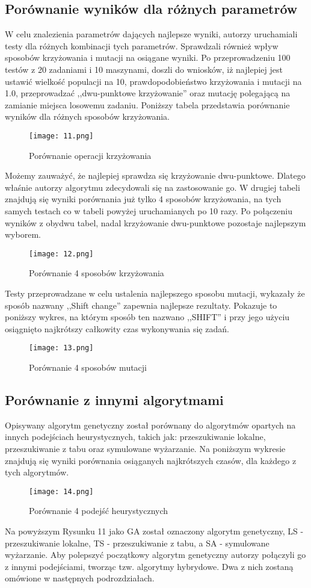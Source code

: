 \documentclass{article}
\begin{document}
\subsection{Porównanie wyników dla różnych parametrów}
 W celu znalezienia parametrów dających najlepsze wyniki, autorzy uruchamiali testy dla różnych kombinacji tych parametrów. Sprawdzali również wpływ sposobów krzyżowania i mutacji na osiągane wyniki. Po przeprowadzeniu 100 testów z 20 zadaniami i 10 maszynami, doszli do wniosków, iż najlepiej jest ustawić wielkość populacji na 10, prawdopodobieństwo krzyżowania i mutacji na 1.0, przeprowadzać ,,dwu-punktowe krzyżowanie'' oraz mutację polegającą na zamianie miejsca losowemu zadaniu. Poniższy tabela przedstawia porównanie wyników dla różnych sposobów krzyżowania.
 \begin{figure}[H]
 \centering
 \texttt{[image: 11.png]}
 \caption{Porównanie operacji krzyżowania}
 \end{figure}
 Możemy zauważyć, że najlepiej sprawdza się krzyżowanie dwu-punktowe. Dlatego właśnie autorzy algorytmu zdecydowali się na zastosowanie go. W drugiej tabeli znajdują się wyniki porównania już tylko 4 sposobów krzyżowania, na tych samych testach co w tabeli powyżej uruchamianych po 10 razy. Po połączeniu wyników z obydwu tabel, nadal krzyżowanie dwu-punktowe pozostaje najlepszym wyborem.
 \begin{figure}[H]
 \centering
 \texttt{[image: 12.png]}
 \caption{Porównanie 4 sposobów krzyżowania}
 \end{figure}
 Testy przeprowadzane w celu ustalenia najlepszego sposobu mutacji, wykazały że sposób nazwany ,,Shift change'' zapewnia najlepsze rezultaty. Pokazuje to poniższy wykres, na którym sposób ten nazwano ,,SHIFT'' i przy jego użyciu osiągnięto najkrótszy całkowity czas wykonywania się zadań.
 \begin{figure}[H]
 \centering
 \texttt{[image: 13.png]}
 \caption{Porównanie 4 sposobów mutacji}
 \end{figure}

\subsection{Porównanie z innymi algorytmami}
 Opisywany algorytm genetyczny został porównany do algorytmów opartych na innych podejściach heurystycznych, takich jak: przeszukiwanie lokalne, przeszukiwanie z tabu oraz symulowane wyżarzanie. Na poniższym wykresie znajdują się wyniki porównania osiąganych najkrótszych czasów, dla każdego z tych algorytmów.
 \begin{figure}[H]
 \centering
 \texttt{[image: 14.png]}
 \caption{Porównanie 4 podejść heurystycznych}
 \end{figure}
 Na powyższym Rysunku 11 jako GA został oznaczony algorytm genetyczny, LS - przeszukiwanie lokalne, TS - przeszukiwanie z tabu, a SA - symulowane wyżarzanie.
 Aby polepszyć początkowy algorytm genetyczny autorzy połączyli go z innymi podejściami, tworząc tzw. algorytmy hybrydowe. Dwa z nich zostaną omówione w następnych podrozdziałach.
\end{document}
